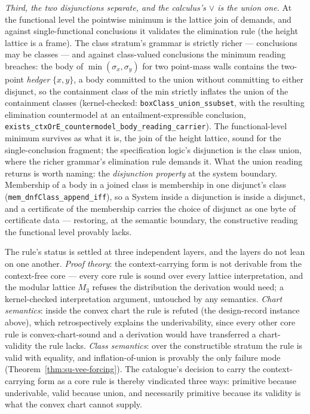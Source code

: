 \emph{Third, the two disjunctions separate, and the calculus's
$\vee$ is the union one.} At the functional level the pointwise
minimum is the lattice join of demands, and against
single-functional conclusions it validates the elimination rule
(the height lattice is a frame). The class stratum's grammar is
strictly richer --- conclusions may be classes --- and against
class-valued conclusions the minimum reading breaches: the body of
$\min(\sigma_x, \sigma_y)$ for two point-mass walls contains the
two-point \emph{hedger} $\{x, y\}$, a body committed to the union
without committing to either disjunct, so the containment class of
the min strictly inflates the union of the containment classes
(kernel-checked: \texttt{boxClass\_union\_ssubset}, with the
resulting elimination countermodel at an entailment-expressible
conclusion,
\texttt{exists\_ctxOrE\_countermodel\_body\_reading\_carrier}).
The functional-level minimum survives as what it is, the join of
the height lattice, sound for the single-conclusion fragment; the
specification logic's disjunction is the class union, where the
richer grammar's elimination rule demands it. What the union
reading returns is worth naming: the \emph{disjunction property}
at the system boundary. Membership of a body in a joined class is
membership in one disjunct's class
(\texttt{mem\_dnfClass\_append\_iff}), so a System inside a
disjunction is inside a disjunct, and a certificate of the
membership carries the choice of disjunct as one byte of
certificate data --- restoring, at the semantic boundary, the
constructive reading the functional level provably lacks.

\begin{remark}
\label{rem:su-vee-layers}
The rule's status is settled at three independent layers, and the
layers do not lean on one another. \emph{Proof theory}: the
context-carrying form is not derivable from the context-free core
--- every core rule is sound over every lattice interpretation,
and the modular lattice $M_3$ refuses the distribution the
derivation would need; a kernel-checked interpretation argument,
untouched by any semantics. \emph{Chart semantics}: inside the
convex chart the rule is refuted (the design-record instance
above), which retrospectively explains the underivability, since
every other core rule is convex-chart-sound and a derivation would
have transferred a chart-validity the rule lacks. \emph{Class
semantics}: over the constructible stratum the rule is valid with
equality, and inflation-of-union is provably the only failure mode
(Theorem~\ref{thm:su-vee-forcing}). The catalogue's decision to
carry the context-carrying form as a core rule is thereby
vindicated three ways: primitive because underivable, valid
because union, and necessarily primitive because its validity is
what the convex chart cannot supply.
\end{remark}

